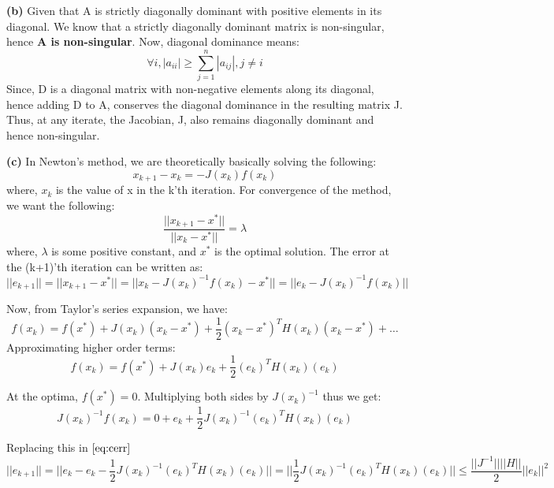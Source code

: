 \documentclass{article}
\renewcommand\part[1]{\vspace{.10in}\textbf{(#1)}}
\begin{document}
  \part{b} Given that A is strictly diagonally dominant with positive elements in its diagonal. We know that a  strictly diagonally dominant matrix is non-singular, hence \textbf {A is non-singular}. Now, diagonal dominance means:
  \[ \forall i, |a_{ii}| \geq \sum_{j=1}^n |a_{ij}|, j \neq i\]
  Since, D is a diagonal matrix with non-negative elements along its diagonal, hence adding D to A, conserves the diagonal dominance in the resulting matrix J. Thus, at any iterate, the Jacobian, J, also remains diagonally dominant and hence non-singular. \newline

  \part{c} In Newton's method, we are theoretically basically solving the following:
  \begin{equation}
	  x_{k+1} - x_k = -J(x_k)f(x_k)
	  \label{eq:newton}
  \end{equation}
  where, $x_k$ is the value of x in the k'th iteration. For convergence of the method, we want the following:
  \begin{equation}
	  \dfrac{|| x_{k+1} - x^*||}{||x_k - x^*||} = \lambda
	  \label{eq:conv}
  \end{equation}
  where, $\lambda$ is some positive constant, and $x^*$ is the optimal solution. \newline
  The error at the (k+1)'th iteration can be written as:
  \begin{equation}
	  ||e_{k+1}|| = || x_{k+1} - x^*|| = || x_k - J(x_k)^{-1}f(x_k) - x^*|| = || e_k - J(x_k)^{-1}f(x_k) ||
  \label{eq:cerr}
  \end{equation}

  Now, from Taylor's series expansion, we have:
  \[f(x_k) = f(x^*) + J(x_k)(x_k - x^*) + \dfrac{1}{2}(x_k - x^*)^TH(x_k)(x_k - x^*) + \dots\]
  Approximating higher order terms:
  \[f(x_k) = f(x^*) + J(x_k)e_k + \dfrac{1}{2}(e_k)^TH(x_k)(e_k) \]

  At the optima, $f(x^*)=0$. Multiplying both sides by $J(x_k)^{-1}$ thus we get:
  \[ J(x_k)^{-1} f(x_k) = 0 + e_k +  \dfrac{1}{2}J(x_k)^{-1}(e_k)^TH(x_k)(e_k)\]

  Replacing this in $\eqref{eq:cerr}$
  \begin{equation}
   ||e_{k+1}|| = || e_k - e_k - \dfrac{1}{2}J(x_k)^{-1}(e_k)^TH(x_k)(e_k) || = ||\dfrac{1}{2}J(x_k)^{-1}(e_k)^TH(x_k)(e_k) || \leq \dfrac{||J^{-1}|| ||H||}{2} ||e_k||^2
   \label{eq:finalConv}
  \end{equation}
\end{document}
